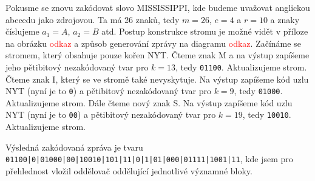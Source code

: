 Pokusme se znovu zakódovat slovo MISSISSIPPI, kde budeme uvažovat anglickou abecedu jako zdrojovou. Ta má 26 znaků, tedy $m=26$, $e = 4$ a $r=10$ a znaky číslujeme $a_1 = A$, $a_2 = B$ atd. Postup konstrukce stromu je možné vidět v příloze na obrázku \textcolor{red}{odkaz} a způsob generování zprávy na diagramu \textcolor{red}{odkaz}. Začínáme se stromem, který obsahuje pouze kořen NYT. Čteme znak M a na výstup zapíšeme jeho pětibitový nezakódovaný tvar pro $k=13$, tedy \texttt{01100}. Aktualizujeme strom. Čteme znak I, který se ve stromě také nevyskytuje. Na výstup zapíšeme kód uzlu NYT (nyní je to \texttt{0}) a pětibitový nezakódovaný tvar pro $k=9$, tedy \texttt{01000}. Aktualizujeme strom. Dále čteme nový znak S. Na výstup zapíšeme kód uzlu NYT (nyní je to \texttt{00}) a pětibitový nezakódovaný tvar pro $k=19$, tedy \texttt{10010}. Aktualizujeme strom. 

Výsledná zakódovaná zpráva je tvaru \texttt{01100|0|01000|00|10010|101|11|0|1|01|000|01111|1001|11}, kde jsem pro přehlednost vložil oddělovač \uv{\texttt{|}} oddělující jednotlivé významné bloky. 